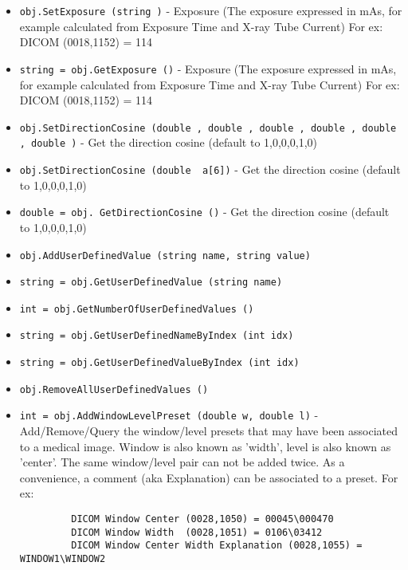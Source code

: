 \begin{itemize}
\item  \verb|obj.SetExposure (string )| -  Exposure (The exposure expressed in mAs, for example calculated
 from Exposure Time and X-ray Tube Current)
 For ex: DICOM (0018,1152) = 114

\item  \verb|string = obj.GetExposure ()| -  Exposure (The exposure expressed in mAs, for example calculated
 from Exposure Time and X-ray Tube Current)
 For ex: DICOM (0018,1152) = 114

\item  \verb|obj.SetDirectionCosine (double , double , double , double , double , double )| -  Get the direction cosine (default to 1,0,0,0,1,0)

\item  \verb|obj.SetDirectionCosine (double  a[6])| -  Get the direction cosine (default to 1,0,0,0,1,0)

\item  \verb|double = obj. GetDirectionCosine ()| -  Get the direction cosine (default to 1,0,0,0,1,0)

\item  \verb|obj.AddUserDefinedValue (string name, string value)|

\item  \verb|string = obj.GetUserDefinedValue (string name)|

\item  \verb|int = obj.GetNumberOfUserDefinedValues ()|

\item  \verb|string = obj.GetUserDefinedNameByIndex (int idx)|

\item  \verb|string = obj.GetUserDefinedValueByIndex (int idx)|

\item  \verb|obj.RemoveAllUserDefinedValues ()|

\item  \verb|int = obj.AddWindowLevelPreset (double w, double l)| -  Add/Remove/Query the window/level presets that may have been associated
 to a medical image. Window is also known as 'width', level is also known
 as 'center'. The same window/level pair can not be added twice.
 As a convenience, a comment (aka Explanation) can be associated to
 a preset.
 For ex:
 \begin{verbatim}
         DICOM Window Center (0028,1050) = 00045\000470
         DICOM Window Width  (0028,1051) = 0106\03412
         DICOM Window Center Width Explanation (0028,1055) = WINDOW1\WINDOW2
 \end{verbatim}


\end{itemize}
